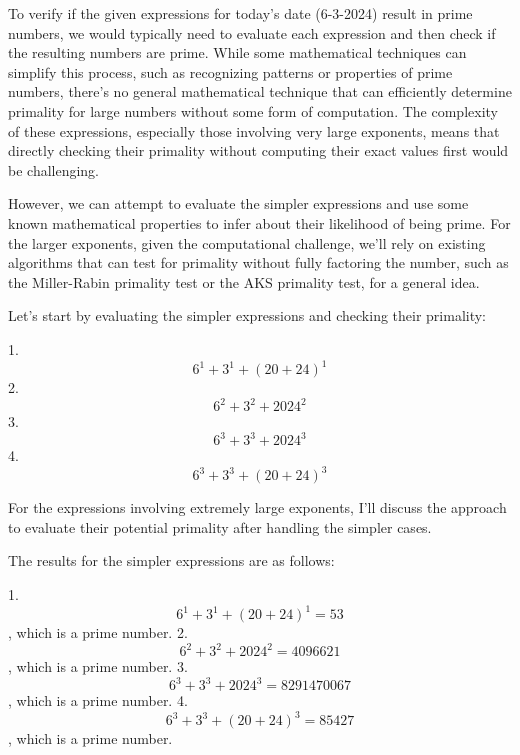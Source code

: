 \documentclass[a4paper]{article}
\begin{document}
To verify if the given expressions for today's date (6-3-2024) result in prime numbers, we would typically need to evaluate each expression and then check if the resulting numbers are prime. While some mathematical techniques can simplify this process, such as recognizing patterns or properties of prime numbers, there's no general mathematical technique that can efficiently determine primality for large numbers without some form of computation. The complexity of these expressions, especially those involving very large exponents, means that directly checking their primality without computing their exact values first would be challenging.

However, we can attempt to evaluate the simpler expressions and use some known mathematical properties to infer about their likelihood of being prime. For the larger exponents, given the computational challenge, we'll rely on existing algorithms that can test for primality without fully factoring the number, such as the Miller-Rabin primality test or the AKS primality test, for a general idea.

Let's start by evaluating the simpler expressions and checking their primality:

1. \begin{equation}6^1 + 3^1 + (20+24)^1\end{equation}
2. \begin{equation}6^2 + 3^2 + 2024^2\end{equation}
3. \begin{equation}6^3 + 3^3 + 2024^3\end{equation}
4. \begin{equation}6^3 + 3^3 + (20+24)^3\end{equation}

For the expressions involving extremely large exponents, I'll discuss the approach to evaluate their potential primality after handling the simpler cases.

The results for the simpler expressions are as follows:

1. \begin{equation}6^1 + 3^1 + (20+24)^1 = 53\end{equation}, which is a prime number.
2. \begin{equation}6^2 + 3^2 + 2024^2 = 4096621\end{equation}, which is a prime number.
3. \begin{equation}6^3 + 3^3 + 2024^3 = 8291470067\end{equation}, which is a prime number.
4. \begin{equation}6^3 + 3^3 + (20+24)^3 = 85427\end{equation}, which is a prime number.
\end{document}
